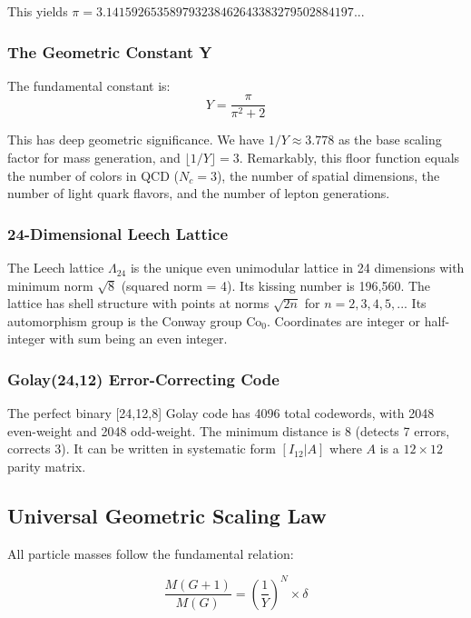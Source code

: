 \documentclass[11pt]{article}
\begin{document}
This yields $\pi = 3.141592653589793238462643383279502884197...$

\subsubsection{The Geometric Constant Y}

The fundamental constant is:
\begin{equation}
Y = \frac{\pi}{\pi^2 + 2}
\end{equation}

This has deep geometric significance. We have $1/Y \approx 3.778$ as the base scaling factor for mass generation, and $\lfloor 1/Y \rfloor = 3$. Remarkably, this floor function equals the number of colors in QCD ($N_c = 3$), the number of spatial dimensions, the number of light quark flavors, and the number of lepton generations.

\subsubsection{24-Dimensional Leech Lattice}

The Leech lattice $\Lambda_{24}$ is the unique even unimodular lattice in 24 dimensions with minimum norm $\sqrt{8}$ (squared norm = 4). Its kissing number is 196,560. The lattice has shell structure with points at norms $\sqrt{2n}$ for $n = 2,3,4,5,...$ Its automorphism group is the Conway group Co$_0$. Coordinates are integer or half-integer with sum being an even integer.

\subsubsection{Golay(24,12) Error-Correcting Code}

The perfect binary [24,12,8] Golay code has 4096 total codewords, with 2048 even-weight and 2048 odd-weight. The minimum distance is 8 (detects 7 errors, corrects 3). It can be written in systematic form $[I_{12} | A]$ where $A$ is a $12 \times 12$ parity matrix.

\subsection{Universal Geometric Scaling Law}

All particle masses follow the fundamental relation:

\begin{equation}
\frac{M(G+1)}{M(G)} = \left(\frac{1}{Y}\right)^N \times \delta
\end{equation}
\end{document}
